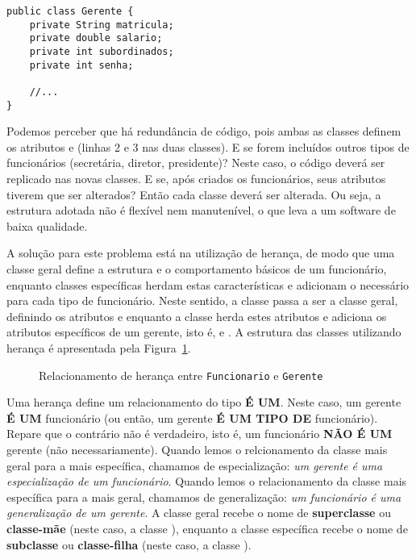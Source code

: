 \begin{verbatim}
public class Gerente {
	private String matricula;
	private double salario;
	private int subordinados;
	private int senha;
	
	//...
}
\end{verbatim}
 
Podemos perceber que há redundância de código, pois ambas as classes definem os atributos  e  (linhas 2 e 3 nas duas classes). E se forem incluídos outros tipos de funcionários (secretária, diretor, presidente)? Neste caso, o código deverá ser replicado nas novas classes. E se, após criados os funcionários, seus atributos tiverem que ser alterados? Então cada classe deverá ser alterada. Ou seja, a estrutura adotada não é flexível nem manutenível, o que leva a um software de baixa qualidade.

A solução para este problema está na utilização de herança, de modo que uma classe geral define a estrutura e o comportamento básicos de um funcionário, enquanto classes específicas herdam estas características e adicionam o necessário para cada tipo de funcionário. Neste sentido, a classe  passa a ser a classe geral, definindo os atributos  e  enquanto a classe  herda estes atributos e adiciona os atributos específicos de um gerente, isto é,  e . A estrutura das classes utilizando herança é apresentada pela Figura~\ref{fig:heranca-funcionario-gerente}.

\begin{figure}[h]
	\centering
	
	
	\caption{Relacionamento de herança entre \texttt{Funcionario} e \texttt{Gerente}}
	\label{fig:heranca-funcionario-gerente}
\end{figure}

Uma herança define um relacionamento do tipo \textbf{É UM}. Neste caso, um gerente \textbf{É UM} funcionário (ou então, um gerente \textbf{É UM TIPO DE} funcionário). Repare que o contrário não é verdadeiro, isto é, um funcionário \textbf{NÃO É UM} gerente (não necessariamente). Quando lemos o relcionamento da classe mais geral para a mais específica, chamamos de especialização: \textit{um gerente é uma especialização de um funcionário}. Quando lemos o relacionamento da classe mais específica para a mais geral, chamamos de generalização: \textit{um funcionário é uma generalização de um gerente}. A classe geral recebe o nome de \textbf{superclasse} ou \textbf{classe-mãe} (neste caso, a classe ), enquanto a classe específica recebe o nome de \textbf{subclasse} ou \textbf{classe-filha} (neste caso, a classe ).

